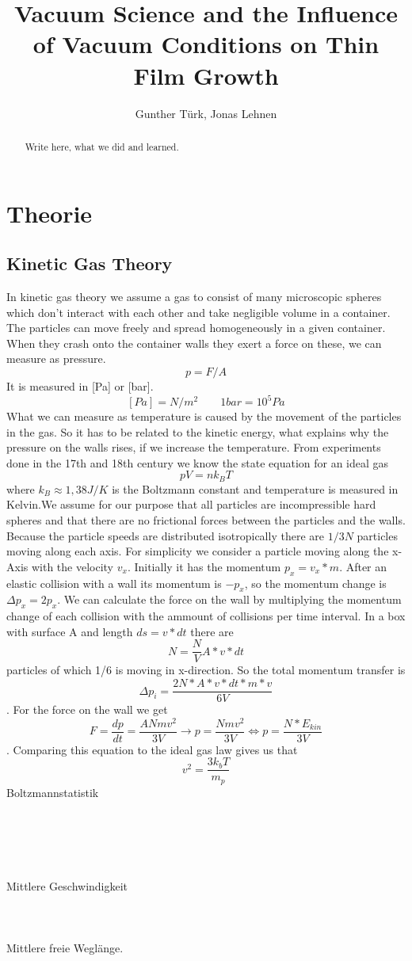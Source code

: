 \documentclass[]{article}
\title{Vacuum Science and the Inﬂuence of Vacuum Conditions on Thin Film Growth}
\author{Gunther Türk, Jonas Lehnen}
\begin{document}
\maketitle
\tableofcontents
\begin{abstract}
Write here, what we did and learned.
\end{abstract}

\section{Theorie}
\subsection{Kinetic Gas Theory}
In kinetic gas theory we assume a gas to consist of many microscopic spheres which don't interact with each other and take negligible volume in a container. The particles can move freely and spread homogeneously in a given container. When they crash onto the container walls they exert a force on these, we can measure as pressure. 
\[ p=F/A \]
It is measured in [Pa] or [bar].
\[ [Pa]=N/m^{2}     \qquad  1bar=10^{5}Pa		 \]
What we can measure as temperature is caused by the movement of the particles in the gas. So it has to be related to the kinetic energy, what explains why the pressure on the walls rises, if we increase the temperature. From experiments done in the 17th and 18th century we know the state equation for an ideal gas
\[ pV=nk_{B} T\]
 where $k_{B}\approx1,38J/K$ is the Boltzmann constant and temperature is measured in Kelvin.We assume for our purpose that all particles are incompressible hard spheres and that there are no frictional forces between the particles and the walls. Because the particle speeds are distributed isotropically there are $1/3N$ particles moving along each axis. For simplicity we consider a particle moving along the x-Axis with the velocity $v_{x}$. Initially it has the momentum $p_{x}=v_{x}*m$. After an elastic collision with a wall its momentum is $-p_{x}$, so the momentum change is $\Delta p_{x}=2p_{x}$. We can calculate the force on the wall by multiplying the momentum change of each collision with the ammount of collisions per time interval. In a box with surface A and length $ds=v*dt$ there are \[ N=\frac{N}{V}A *v* dt \] particles of which 1/6 is moving in x-direction. So the total momentum transfer is \[ \Delta p_{i}=\frac{2N* A* v* dt*m* v}{6V} \]. For the force on the wall we get \[ F=\frac{dp}{dt}=\frac{ANmv^{2}}{3V} \rightarrow p=\frac{Nmv^{2}}{3V} \Leftrightarrow p=\frac{N*E_{kin}}{3V}\]. Comparing this equation to the ideal gas law gives us that \[ v^{2}=\frac{3k_{b}T}{m_{p}} \] 
 Boltzmannstatistik \\\\\\\\\\\\
Mittlere Geschwindigkeit
\\\\\\\\
Mittlere freie Weglänge.
\end{document}

